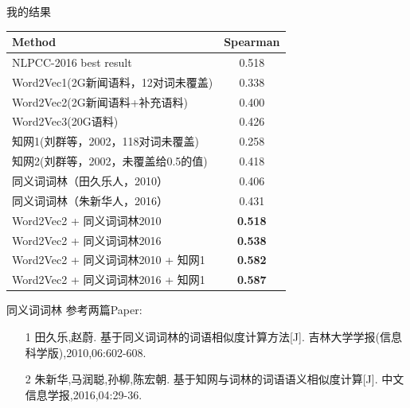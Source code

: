\documentclass[aspectratio=169]{beamer} %
\begin{document}
    \begin{frame}{我的结果}
          \begin{table}
      \centering
      \label{tab:commands}
      \begin{minipage}{\columnwidth}
      \begin{center}
      \begin{tabular}{lc}
      \hline
       Method                          &  Spearman \\ \hline
       NLPCC-2016 best result  & 0.518 \\ \hline
       Word2Vec1(2G新闻语料，12对词未覆盖) & 0.338 \\ \hline
       Word2Vec2(2G新闻语料+补充语料)      & 0.400 \\ \hline
       Word2Vec3(20G语料)                & 0.426 \\ \hline
       知网1(刘群等，2002，118对词未覆盖)    & 0.258  \\ \hline
       知网2(刘群等，2002，未覆盖给0.5的值)  & 0.418  \\ \hline
       同义词词林（田久乐人，2010）       & 0.406  \\ \hline
       同义词词林（朱新华人，2016）       & 0.431  \\ \hline
       Word2Vec2 + 同义词词林2010        & \textbf{0.518}  \\ \hline
       Word2Vec2 + 同义词词林2016        & \textbf{0.538}  \\ \hline
       Word2Vec2 + 同义词词林2010 + 知网1 & \textbf{0.582}  \\ \hline
       Word2Vec2 + 同义词词林2016 + 知网1 & \textbf{0.587}  \\ \hline
      \end{tabular}
      \end{center}
      \end{minipage}
      \end{table}
    \end{frame}

    \begin{frame}{同义词词林}
    参考两篇Paper: 
    \begin{itemize}
      \item [1]田久乐,赵蔚. 基于同义词词林的词语相似度计算方法[J]. 吉林大学学报(信息科学版),2010,06:602-608. \\
      \item [2]朱新华,马润聪,孙柳,陈宏朝. 基于知网与词林的词语语义相似度计算[J]. 中文信息学报,2016,04:29-36. \\
    \end{itemize}
    \end{frame}
\end{document}
